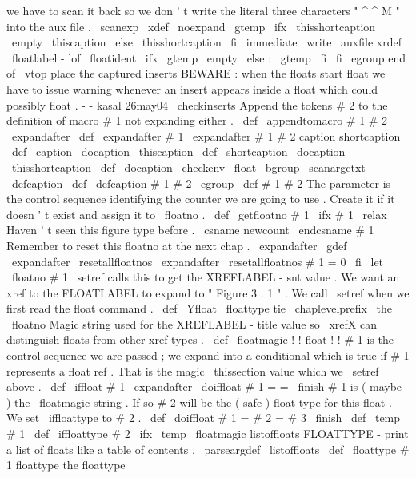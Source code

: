 {{{we
have
to
scan
it
back
so
%
we
don
'
t
write
the
literal
three
characters
"
^
^
M
"
into
the
aux
file
.
\
scanexp
{
%
\
xdef
\
noexpand
\
gtemp
{
%
\
ifx
\
thisshortcaption
\
empty
\
thiscaption
\
else
\
thisshortcaption
\
fi
}
%
}
%
\
immediate
\
write
\
auxfile
{
xrdef
{
\
floatlabel
-
lof
}
{
\
floatident
\
ifx
\
gtemp
\
empty
\
else
:
\
gtemp
\
fi
}
}
%
}
%
\
fi
\
egroup
%
end
of
\
vtop
%
%
place
the
captured
inserts
%
%
BEWARE
:
when
the
floats
start
float
we
have
to
issue
warning
whenever
an
%
insert
appears
inside
a
float
which
could
possibly
float
.
-
-
kasal
26may04
%
\
checkinserts
}
%
Append
the
tokens
#
2
to
the
definition
of
macro
#
1
not
expanding
either
.
%
\
def
\
appendtomacro
#
1
#
2
{
%
\
expandafter
\
def
\
expandafter
#
1
\
expandafter
{
#
1
#
2
}
%
}
%
caption
shortcaption
%
\
def
\
caption
{
\
docaption
\
thiscaption
}
\
def
\
shortcaption
{
\
docaption
\
thisshortcaption
}
\
def
\
docaption
{
\
checkenv
\
float
\
bgroup
\
scanargctxt
\
defcaption
}
\
def
\
defcaption
#
1
#
2
{
\
egroup
\
def
#
1
{
#
2
}
}
%
The
parameter
is
the
control
sequence
identifying
the
counter
we
are
%
going
to
use
.
Create
it
if
it
doesn
'
t
exist
and
assign
it
to
\
floatno
.
\
def
\
getfloatno
#
1
{
%
\
ifx
#
1
\
relax
%
Haven
'
t
seen
this
figure
type
before
.
\
csname
newcount
\
endcsname
#
1
%
%
%
Remember
to
reset
this
floatno
at
the
next
chap
.
\
expandafter
\
gdef
\
expandafter
\
resetallfloatnos
\
expandafter
{
\
resetallfloatnos
#
1
=
0
}
%
\
fi
\
let
\
floatno
#
1
%
}
%
\
setref
calls
this
to
get
the
XREFLABEL
-
snt
value
.
We
want
an
xref
%
to
the
FLOATLABEL
to
expand
to
"
Figure
3
.
1
"
.
We
call
\
setref
when
we
%
first
read
the
float
command
.
%
\
def
\
Yfloat
{
\
floattype
tie
\
chaplevelprefix
\
the
\
floatno
}
%
%
Magic
string
used
for
the
XREFLABEL
-
title
value
so
\
xrefX
can
%
distinguish
floats
from
other
xref
types
.
\
def
\
floatmagic
{
!
!
float
!
!
}
%
#
1
is
the
control
sequence
we
are
passed
;
we
expand
into
a
conditional
%
which
is
true
if
#
1
represents
a
float
ref
.
That
is
the
magic
%
\
thissection
value
which
we
\
setref
above
.
%
\
def
\
iffloat
#
1
{
\
expandafter
\
doiffloat
#
1
=
=
\
finish
}
%
%
#
1
is
(
maybe
)
the
\
floatmagic
string
.
If
so
#
2
will
be
the
%
(
safe
)
float
type
for
this
float
.
We
set
\
iffloattype
to
#
2
.
%
\
def
\
doiffloat
#
1
=
#
2
=
#
3
\
finish
{
%
\
def
\
temp
{
#
1
}
%
\
def
\
iffloattype
{
#
2
}
%
\
ifx
\
temp
\
floatmagic
}
%
listoffloats
FLOATTYPE
-
print
a
list
of
floats
like
a
table
of
contents
.
%
\
parseargdef
\
listoffloats
{
%
\
def
\
floattype
{
#
1
}
%
floattype
{
%
%
the
floattype
}}}

